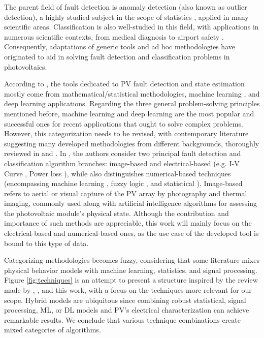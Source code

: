 The parent field of fault detection is anomaly detection (also known as outlier detection), a highly studied subject in the scope of statistics \cite{Prasad2009}, applied in many scientific areas. Classification is also well-studied in this field, with applications in numerous scientific contexts, from medical diagnosis to airport safety \cite{classification}. Consequently, adaptations of generic tools and ad hoc methodologies have originated to aid in solving fault detection and classification problems in photovoltaics.

According to \cite{AIPV}, the tools dedicated to PV fault detection and state estimation mostly come from mathematical/statistical methodologies, machine learning , and deep learning applications. Regarding the three general problem-solving principles mentioned before, machine learning and deep learning are the most popular and successful ones for recent applications that ought to solve complex problems. However, this categorization needs to be revised, with contemporary literature suggesting many developed methodologies from different backgrounds, thoroughly reviewed in \cite{Hong2022} and \cite{Livera2019}. In \cite{Hong2022}, the authors consider two principal fault detection and classification algorithm branches: image-based and electrical-based (e.g. I-V Curve \cite{e_iv_1}\cite{e_iv_2}\cite{e_iv_3}, Power loss \cite{e_pl_1}\cite{e_pl_2}\cite{e_pl_3}\cite{e_pl_4}\cite{e_pl_5}), while \cite{Livera2019} also distinguishes numerical-based techniques (encompassing machine learning \cite{n_ann_1}\cite{n_ann_2}\cite{n_ann_3}, fuzzy logic \cite{n_f_1}\cite{n_f_2}\cite{n_f_3}, and statistical \cite{n_s_1}\cite{n_s_2}\cite{n_s_3}). Image-based refers to aerial or visual capture of the PV array by photography and thermal imaging, commonly used along with artificial intelligence algorithms for assessing the photovoltaic module's physical state. Although the contribution and importance of such methods are appreciable, this work will mainly focus on the electrical-based and numerical-based ones, as the use case of the developed tool is bound to this type of data.

Categorizing methodologies becomes fuzzy, considering that some literature mixes physical behavior models with machine learning, statistics, and signal processing. Figure \ref{fig:techniques} is an attempt to present a structure inspired by the review made by \cite{Hong2022}, \cite{Livera2019}, and this work, with a focus on the techniques more relevant for our scope. Hybrid models are ubiquitous since combining robust statistical, signal processing, ML, or DL models and PV's electrical characterization can achieve remarkable results. We conclude that various technique combinations create mixed categories of algorithms.
 
